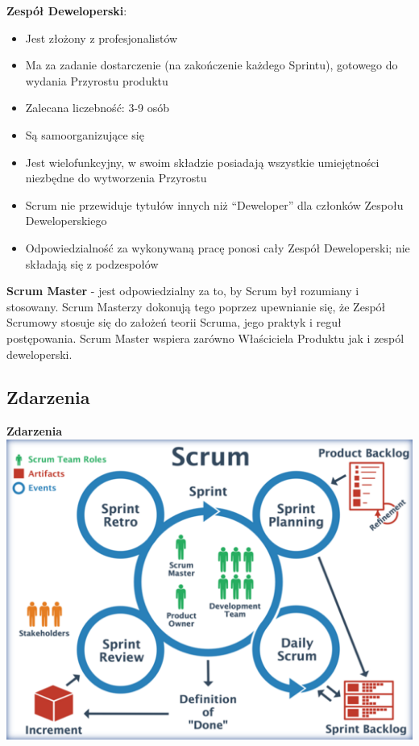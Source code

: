\documentclass[12pt]{article}
\begin{document}
    \begin{definition}
    \textbf{Zespół Deweloperski}:
    \begin{itemize}
        \item Jest złożony z profesjonalistów
        \item Ma za zadanie dostarczenie (na zakończenie każdego Sprintu), gotowego do wydania Przyrostu produktu
        \item Zalecana liczebność: 3-9 osób
        \item Są samoorganizujące się
        \item Jest wielofunkcyjny, w swoim składzie posiadają wszystkie umiejętności niezbędne do wytworzenia Przyrostu
        \item Scrum nie przewiduje tytułów innych niż ``Deweloper'' dla członków Zespołu Deweloperskiego
        \item Odpowiedzialność za wykonywaną pracę ponosi cały Zespół Deweloperski; nie składają się z podzespołów
    \end{itemize}
    \end{definition}
    
    \begin{definition}
    \textbf{Scrum Master} - jest odpowiedzialny za to, by Scrum był rozumiany i stosowany. Scrum Masterzy dokonują tego poprzez upewnianie się,
    że Zespół Scrumowy stosuje się do założeń teorii Scruma, jego praktyk i reguł postępowania. Scrum Master wspiera zarówno Właściciela Produktu jak i zespól deweloperski.
    \end{definition}
    
    \subsection{Zdarzenia}
    
    \begin{definition}
    \textbf{Zdarzenia} \\
    \includegraphics[width=\linewidth]{scrum_events.png}
    \end{definition}
    
\end{document}
